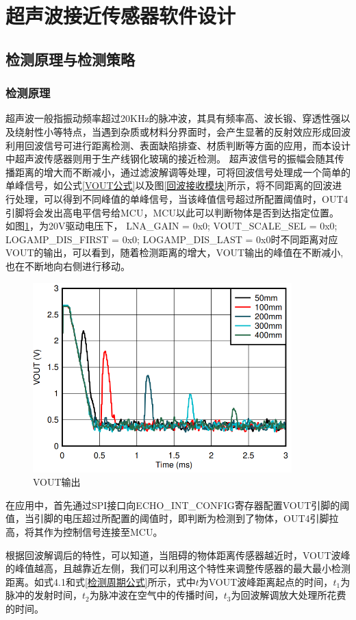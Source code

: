     \newpage
	\section{超声波接近传感器软件设计}
    \subsection{检测原理与检测策略}
    

    
    \subsubsection{检测原理}
    超声波一般指振动频率超过20KHz的脉冲波，其具有频率高、波长锻、穿透性强以及绕射性小等特点，当遇到杂质或材料分界面时，会产生显著的反射效应形成回波利用回波信号可进行距离检测、表面缺陷排查、材质判断等方面的应用，而本设计中超声波传感器则用于生产线钢化玻璃的接近检测。
    超声波信号的振幅会随其传播距离的增大而不断减小，通过滤波解调等处理，可将回波信号处理成一个简单的单峰信号，如公式\ref{VOUT公式}以及图\ref{回波接收模块}所示，将不同距离的回波进行处理，可以得到不同峰值的单峰信号，当该峰值信号超过所配置阈值时，OUT4引脚将会发出高电平信号给MCU，MCU以此可以判断物体是否到达指定位置。
    如图\ref{VOUT输出}，为20V驱动电压下， LNA\_GAIN = 0x0; VOUT\_SCALE\_SEL = 0x0; 
LOGAMP\_DIS\_FIRST = 0x0; LOGAMP\_DIS\_LAST = 0x0时不同距离对应VOUT的输出，可以看到，随着检测距离的增大，VOUT输出的峰值在不断减小,也在不断地向右侧进行移动。\par
    \begin{figure}[ht]
        \centering
        \includegraphics[width=10cm]{figure/VOUT image.png}
        \caption{VOUT输出}
        \label{VOUT输出}
    \end{figure}
    在应用中，首先通过SPI接口向ECHO\_INT\_CONFIG寄存器配置VOUT引脚的阈值，当引脚的电压超过所配置的阈值时，即判断为检测到了物体，OUT4引脚拉高，将其作为控制信号连接至MCU。\par
    根据回波解调后的特性，可以知道，当阻碍的物体距离传感器越近时，VOUT波峰的峰值越高，且越靠近左侧，我们可以利用这个特性来调整传感器的最大最小检测距离。如式4.1和式\ref{检测周期公式}所示，式中$t$为VOUT波峰距离起点的时间，$t_1$为脉冲的发射时间，$t_2$为脉冲波在空气中的传播时间，$t_3$为回波解调放大处理所花费的时间。
 
